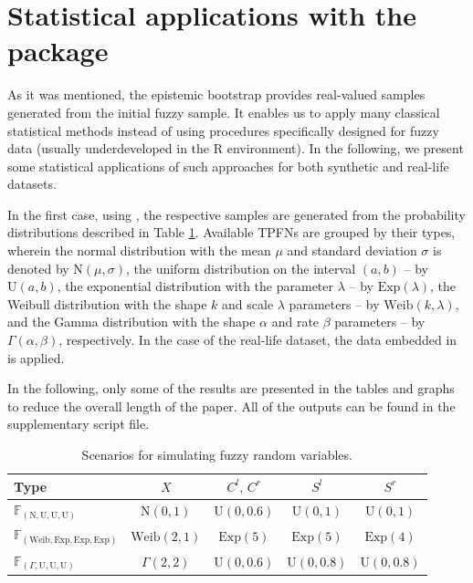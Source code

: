 

\section{Statistical applications with the package}


As it was mentioned, the epistemic bootstrap provides real-valued samples generated from the initial fuzzy sample. It enables us to apply many classical statistical methods instead of using procedures specifically designed for fuzzy data (usually underdeveloped in the R environment).
In the following, we present some statistical applications of such approaches for both synthetic and real-life datasets.

In the first case, using , the respective samples are generated from the probability distributions described in Table \ref{tab100}.
Available TPFNs are grouped by their types, wherein the normal distribution with the mean $\mu$ and standard deviation $\sigma$ is denoted by $\mathrm{N}(\mu,\sigma)$, the uniform distribution on the interval $(a,b)$ -- by $\mathrm{U}(a,b)$, the exponential distribution with the parameter $\lambda$ -- by $\mathrm{Exp}(\lambda)$, the Weibull distribution with the shape $k$ and scale $\lambda$ parameters -- by $\mathrm{Weib} (k,\lambda)$, and the Gamma distribution with the shape $\alpha$ and rate $\beta$ parameters  -- by $\Gamma (\alpha,\beta)$, respectively.
In the case of the real-life dataset, the data  embedded in  is applied.

In the following, only some of the results are presented in the tables and graphs to reduce the overall length of the paper.
All of the outputs can be found in the supplementary script file.

\begin{table}[htbp]
\centering

\begin{tabular}{l|cccc}
\hline 
 Type & $X$ & $C^l,\, C^r$ & $S^l$ &  $ S^r$   \\ 
\hline
$\mathbb{F}_{(\mathrm{N,U,U,U})}$ & $\mathrm{N}(0,1)$ & $\mathrm{U}(0,0.6)$ &  $\mathrm{U}(0,1)$ &  $\mathrm{U}(0,1)$  \\
$\mathbb{F}_{(\mathrm{Weib,Exp,Exp,Exp})}$ & $\mathrm{Weib} (2,1)$ &  $\mathrm{Exp}(5)$ & $\mathrm{Exp}(5)$ & $\mathrm{Exp}(4)$\\
$\mathbb{F}_{(\Gamma,\mathrm{U,U,U})}$ & $\Gamma (2,2)$ & $\mathrm{U}(0,0.6)$ &  $\mathrm{U}(0,0.8)$ &  $\mathrm{U}(0,0.8)$  \\
\hline

\end{tabular}
\caption{Scenarios for simulating fuzzy random variables.}\label{tab100}
\end{table}


